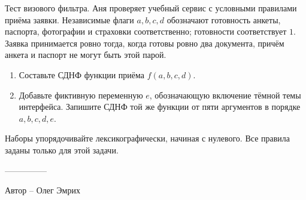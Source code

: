 \question
Тест визового фильтра. Аня проверяет учебный сервис с условными правилами приёма заявки. Независимые флаги $a,b,c,d$ обозначают готовность анкеты, паспорта, фотографии и страховки соответственно; готовности соответствует $1$. Заявка принимается ровно тогда, когда готовы ровно два документа, причём анкета и паспорт не могут быть этой парой.
\begin{enumerate}
\item Составьте СДНФ функции приёма $f(a,b,c,d)$.
\item Добавьте фиктивную переменную $e$, обозначающую включение тёмной темы интерфейса. Запишите СДНФ той же функции от пяти аргументов в порядке $a,b,c,d,e$.
\end{enumerate}
Наборы упорядочивайте лексикографически, начиная с нулевого. Все правила заданы только для этой задачи.

---------------

Автор -- Олег Эмрих
